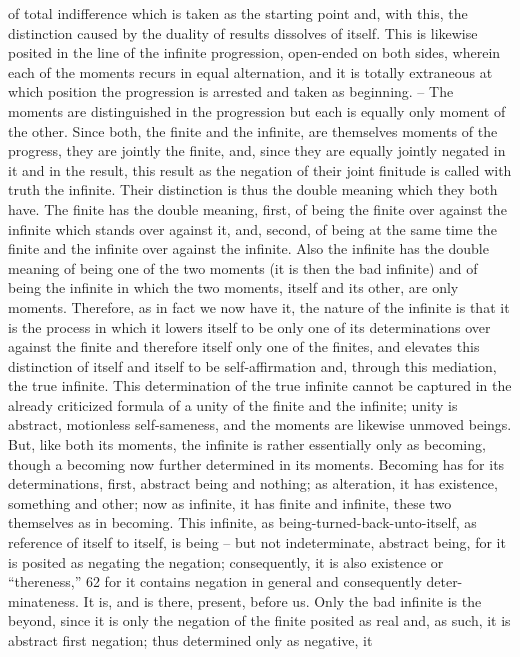 of total indifference which is taken as the starting point and, with this,
the distinction caused by the duality of results dissolves of itself. This is
likewise posited in the line of the infinite progression, open-ended on both
sides, wherein each of the moments recurs in equal alternation, and it is
totally extraneous at which position the progression is arrested and taken
as beginning. – The moments are distinguished in the progression but each
is equally only moment of the other. Since both, the finite and the infinite,
are themselves moments of the progress, they are jointly the finite, and,
since they are equally jointly negated in it and in the result, this result as
the negation of their joint finitude is called with truth the infinite. Their
distinction is thus the double meaning which they both have. The finite has
the double meaning, first, of being the finite over against the infinite which
stands over against it, and, second, of being at the same time the finite
and the infinite over against the infinite. Also the infinite has the double
meaning of being one of the two moments (it is then the bad infinite)
and of being the infinite in which the two moments, itself and its other,
are only moments. Therefore, as in fact we now have it, the nature of the
infinite is that it is the process in which it lowers itself to be only one of its
determinations over against the finite and therefore itself only one of the
finites, and elevates this distinction of itself and itself to be self-affirmation
and, through this mediation, the true infinite.
This determination of the true infinite cannot be captured in the already
criticized formula of a unity of the finite and the infinite; unity is abstract,
motionless self-sameness, and the moments are likewise unmoved beings.
But, like both its moments, the infinite is rather essentially only as becoming,
though a becoming now further determined in its moments. Becoming has
for its determinations, first, abstract being and nothing; as alteration, it has
existence, something and other; now as infinite, it has finite and infinite,
these two themselves as in becoming.
This infinite, as being-turned-back-unto-itself, as reference of itself
to itself, is being – but not indeterminate, abstract being, for it is
posited as negating the negation; consequently, it is also existence or
“thereness,” 62 for it contains negation in general and consequently deter-
minateness. It is, and is there, present, before us. Only the bad infinite is
the beyond, since it is only the negation of the finite posited as real and,
as such, it is abstract first negation; thus determined only as negative, it
